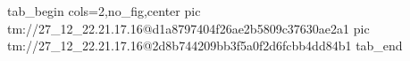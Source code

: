  
 
 
 
 

\qqSecOrig


\ifcmt
  tab_begin cols=2,no_fig,center
    pic tm://27_12_22.21.17.16@d1a8797404f26ae2b5809c37630ae2a1
    pic tm://27_12_22.21.17.16@2d8b744209bb3f5a0f2d6fcbb4dd84b1
  tab_end
\fi

